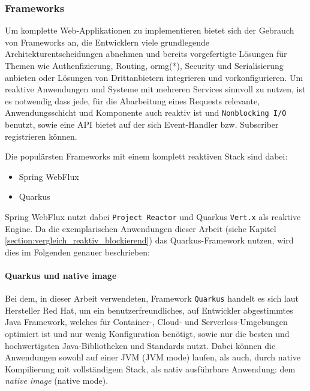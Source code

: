 \subsubsection{Frameworks}
\label{subsubsec:frameworks}
Um komplette Web-Applikationen zu implementieren bietet sich der Gebrauch von Frameworks an, die Entwicklern viele grundlegende Architekturentscheidungen
abnehmen und bereits vorgefertigte Lösungen für Themen wie Authenfizierung, Routing, \Gls{ormg}(*), Security und Serialisierung anbieten oder
Lösungen von Drittanbietern integrieren und vorkonfigurieren.
Um reaktive Anwendungen und Systeme mit mehreren Services sinnvoll zu nutzen, ist es notwendig dass jede, für die Abarbeitung eines Requests relevante,
Anwendungsschicht und Komponente auch reaktiv ist und \verb|Nonblocking I/O| benutzt, sowie eine API bietet auf der
sich Event-Handler bzw. Subscriber registrieren können.

Die populärsten Frameworks mit einem komplett reaktiven Stack sind dabei:

\begin{itemize}
    \item Spring WebFlux
    \item Quarkus
\end{itemize}

Spring WebFlux nutzt dabei \verb|Project Reactor| und Quarkus \verb|Vert.x| als reaktive Engine. \parencite{QuarkusReactiveGettingStarted}
Da die exemplarischen Anwendungen dieser Arbeit (siehe Kapitel \ref{section:vergleich_reaktiv_blockierend}) das Quarkus-Framework nutzen, wird dies
im Folgenden genauer beschrieben:
\paragraph{Quarkus und native image}

Bei dem, in dieser Arbeit verwendeten, Framework \verb|Quarkus| handelt es sich laut Hersteller Red Hat, um ein
benutzerfreundliches, auf Entwickler abgestimmtes Java Framework, welches für Container-, Cloud- und Serverless-Umgebungen optimiert ist und nur wenig
Konfiguration benötigt, sowie nur die besten und hochwertigsten Java-Bibliotheken und Standards nutzt.
Dabei können die Anwendungen sowohl auf einer JVM (JVM mode) laufen, als auch, durch native Kompilierung mit vollständigem Stack,
als nativ ausführbare Anwendung: dem \textit{native image} (native mode).


